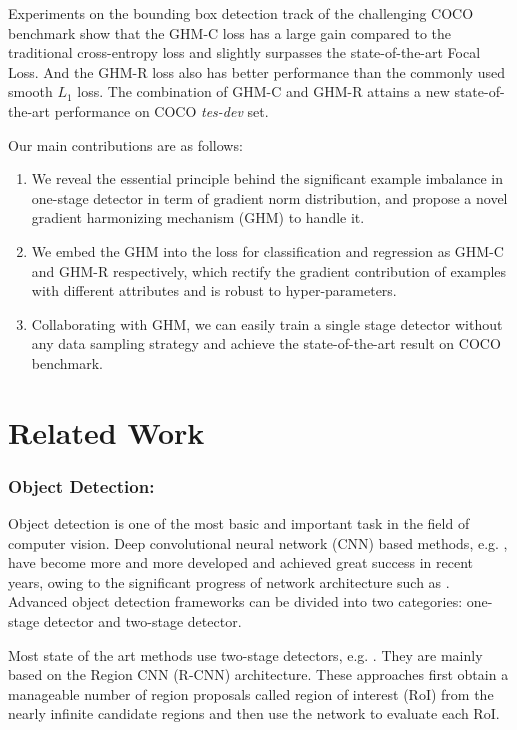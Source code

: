 \documentclass[letterpaper]{article} \usepackage{aaai19}  \usepackage{times}  \usepackage{helvet}  \usepackage{courier}  \usepackage{url}  \usepackage{graphicx}  \usepackage{amsmath,amssymb}
\begin{document}
Experiments on the bounding box detection track of the challenging COCO benchmark show that the GHM-C loss has a large gain compared to the traditional cross-entropy loss and slightly surpasses the state-of-the-art Focal Loss. And the GHM-R loss also has better performance than the commonly used smooth $L_1$ loss. The combination of GHM-C and GHM-R attains a new state-of-the-art performance on COCO \textit{tes-dev} set.

Our main contributions are as follows:
\begin{enumerate}
\item We reveal the essential principle behind the significant example imbalance in one-stage detector in term of gradient norm distribution, and propose a novel gradient harmonizing mechanism (GHM) to handle it.
\item We embed the GHM into the loss for classification and regression as GHM-C and GHM-R respectively, which rectify the gradient contribution of examples with different attributes and is robust to hyper-parameters. 
\item Collaborating with GHM, we can easily train a single stage detector without any data sampling strategy and achieve the state-of-the-art result on COCO benchmark.
\end{enumerate}


\section{Related Work}

\subsubsection{Object Detection:}
Object detection is one of the most basic and important task in the field of computer vision. Deep convolutional neural network (CNN) based methods, e.g. \cite{faster,ssd,yolov2,mask}, have become more and more developed and achieved great success in recent years, owing to the significant progress of network architecture such as \cite{vgg,googlenet,resnet,densely}. Advanced object detection frameworks can be divided into two categories: one-stage detector and two-stage detector.

 Most state of the art methods use two-stage detectors, e.g. \cite{fast,faster,li2017zoom,mask,fpn,zeng2018crafting}. They are mainly based on the Region CNN (R-CNN) architecture. These approaches first obtain a manageable number of region proposals called region of interest (RoI) from the nearly infinite candidate regions and then use the network to evaluate each RoI. 
\end{document}
